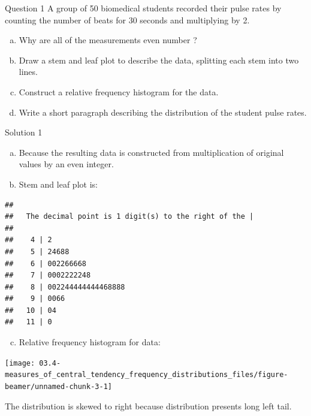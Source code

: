 \documentclass[
  ignorenonframetext,
  aspectratio=169]{beamer}
\providecommand{\tightlist}{%
  \setlength{\itemsep}{0pt}\setlength{\parskip}{0pt}}
\begin{document}
\begin{frame}{Question 1}
\protect\hypertarget{question-1}{}
A group of 50 biomedical students recorded their pulse rates by counting
the number of beats for 30 seconds and multiplying by 2.

\begin{enumerate}
[a.]
\tightlist
\item
  Why are all of the measurements even number ?
\item
  Draw a stem and leaf plot to describe the data, splitting each stem
  into two lines.
\item
  Construct a relative frequency histogram for the data.
\item
  Write a short paragraph describing the distribution of the student
  pulse rates.
\end{enumerate}
\end{frame}

\begin{frame}[fragile]{Solution 1}
\protect\hypertarget{solution-1}{}
\begin{enumerate}
[a.]
\item
  Because the resulting data is constructed from multiplication of
  original values by an even integer.
\item
  Stem and leaf plot is:
\end{enumerate}

\begin{verbatim}
## 
##   The decimal point is 1 digit(s) to the right of the |
## 
##    4 | 2
##    5 | 24688
##    6 | 002266668
##    7 | 0002222248
##    8 | 002244444444468888
##    9 | 0066
##   10 | 04
##   11 | 0
\end{verbatim}

\begin{enumerate}
[a.]
\setcounter{enumi}{2}
\tightlist
\item
  Relative frequency histogram for data:
\end{enumerate}

\texttt{[image: 03.4-measures\_of\_central\_tendency\_frequency\_distributions\_files/figure-beamer/unnamed-chunk-3-1]}

The distribution is skewed to right because distribution presents long
left tail.
\end{frame}
\end{document}
